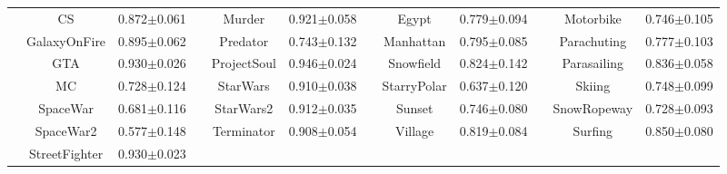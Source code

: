 \documentclass[10pt,journal,compsoc]{IEEEtran}
\begin{document}
\begin{table}
\begin{center}
{\begin{tabular}{*{4}{|c|c|c}|}
 & CS & 0.872$\pm$0.061

& & Murder & 0.921$\pm$0.058

& & Egypt & 0.779$\pm$0.094

& & Motorbike & 0.746$\pm$0.105

\\
   

 & GalaxyOnFire & 0.895$\pm$0.062

& & Predator & 0.743$\pm$0.132

& & Manhattan & 0.795$\pm$0.085

& & Parachuting & 0.777$\pm$0.103

\\
   

 & GTA & 0.930$\pm$0.026

& & ProjectSoul & 0.946$\pm$0.024

& & Snowfield & 0.824$\pm$0.142

& & Parasailing & 0.836$\pm$0.058

\\
   

 & MC & 0.728$\pm$0.124

& & StarWars & 0.910$\pm$0.038

& & StarryPolar & 0.637$\pm$0.120

& & Skiing & 0.748$\pm$0.099

\\
   

 & SpaceWar & 0.681$\pm$0.116

& & StarWars2 & 0.912$\pm$0.035

& & Sunset & 0.746$\pm$0.080

& & SnowRopeway & 0.728$\pm$0.093

\\
   

 & SpaceWar2 & 0.577$\pm$0.148

& & Terminator & 0.908$\pm$0.054

& & Village & 0.819$\pm$0.084

& & Surfing & 0.850$\pm$0.080

\\
   

 & StreetFighter & 0.930$\pm$0.023


\end{tabular}}
\end{center}
\end{table}
\end{document}
